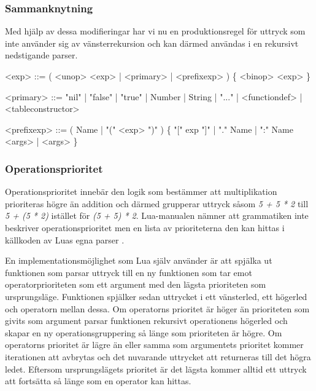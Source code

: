 \subsubsection{Sammanknytning}

Med hjälp av dessa modifieringar har vi nu en produktionsregel för uttryck som
inte använder sig av vänsterrekursion och kan därmed användas i en rekursivt
nedstigande parser.

\setlength{\grammarindent}{6em}
\begin{grammar}
  \singlespace\small%
  \selectfont
  <exp> ::= ( <unop> <exp> | <primary> | <prefixexp> ) \{ <binop> <exp> \}

  <primary> ::= "nil" | "false" | "true" | Number | String | "..." |
      <functiondef> | <tableconstructor>

  <prefixexp> ::= ( Name | "(" <exp> ")" ) \{ "[" exp "]" | "." Name |
      ":" Name <args> | <args> \}
\end{grammar}

\subsubsection{Operationsprioritet}

Operationsprioritet innebär den logik som bestämmer att multiplikation
prioriteras högre än addition och därmed grupperar uttryck såsom \textit{5 + 5
* 2} till \textit{5 + (5 * 2)} istället för \textit{(5 + 5) * 2}. Lua-manualen
nämner att grammatiken inte beskriver operationsprioritet \citep{luaref} men
en lista av prioriteterna den kan hittas i källkoden av Luas egna parser
\citep{lparse}.

En implementationsmöjlighet som Lua själv använder är att spjälka ut
funktionen som parsar uttryck till en ny funktionen som tar emot
operatorprioriteten som ett argument med den lägsta prioriteten som
ursprungsläge. Funktionen spjälker sedan uttrycket i ett vänsterled, ett
högerled och operatorn mellan dessa. Om operatorns prioritet är höger än
prioriteten som givits som argument parsar funktionen rekursivt operationens
högerled och skapar en ny operationsgruppering så länge som prioriteten är
högre. Om operatorns prioritet är lägre än eller samma som argumentets
prioritet kommer iterationen att avbrytas och det nuvarande uttrycket att
returneras till det högra ledet. Eftersom ursprungslägets prioritet är det
lägsta kommer alltid ett uttryck att fortsätta så länge som en operator kan
hittas.

